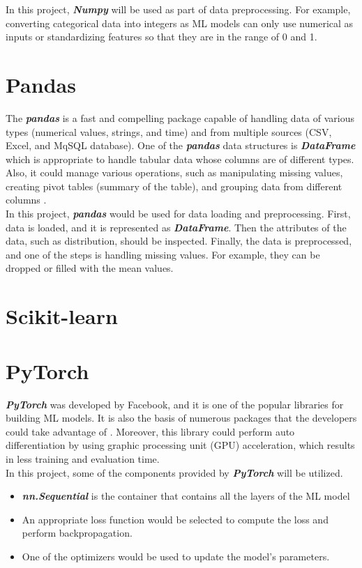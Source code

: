 \documentclass[12pt,twoside]{report}
\begin{document}
In this project, \textit{\textbf{Numpy}} will be used as part of data preprocessing. For example, converting categorical data into integers as ML models can only use numerical as inputs or standardizing features so that they are in the range of 0 and 1. 

\section{Pandas}
The \textbf{\textit{pandas}} is a fast and compelling package capable of handling data of various types (numerical values, strings, and time) and from multiple sources (CSV, Excel, and MqSQL database). One of the \textbf{\textit{pandas}} data structures is \textbf{\textit{DataFrame}} which is appropriate to handle tabular data whose columns are of different types. Also, it could manage various operations, such as manipulating missing values, creating pivot tables (summary of the table), and grouping data from different columns \citep{RN4}. 
\\

In this project, \textbf{\textit{pandas}} would be used for data loading and preprocessing. First, data is loaded, and it is represented as \textbf{\textit{DataFrame}}. Then the attributes of the data, such as distribution, should be inspected. Finally, the data is preprocessed, and one of the steps is handling missing values. For example, they can be dropped or filled with the mean values. 

\section{Scikit-learn}

\section{PyTorch}
\textbf{\textit{PyTorch}} was developed by Facebook, and it is one of the popular libraries for building ML models. It is also the basis of numerous packages that the developers could take advantage of \citep{RN5}. Moreover, this library could perform auto differentiation by using graphic processing unit (GPU) acceleration, which results in less training and evaluation time. 
\\

In this project, some of the components provided by \textbf{\textit{PyTorch}} will be utilized.
\begin{itemize}
	\item \textbf{\textit{nn.Sequential}} is the container that contains all the layers of the ML model
	\item An appropriate loss function would be selected to compute the loss and perform backpropagation. 
	\item One of the optimizers would be used to update the model's parameters. 
\end{itemize}
\end{document}
